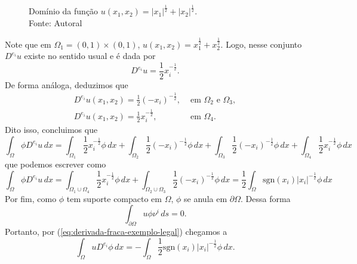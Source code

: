 \documentclass[a4paper, 11pt]{book}
\theoremstyle{definition}
\newcommand{\sgn}{\mathrm{sgn}}
\begin{document}
\begin{ex}
\begin{figure}[H]
        \caption{Domínio da função $u(x_1,x_2) = |x_1|^{\frac{1}{2}} + |x_2|^{\frac{1}{2}}$.\\
        Fonte: Autoral}
        \label{fig:dominio}
    \end{figure}
    Note que em $\Omega_1 = (0,1) \times (0,1)$, $u(x_1,x_2) = x_1^{\frac{1}{2}} + x_2^{\frac{1}{2}}$. Logo, nesse conjunto $D^{e_i} u$ existe no sentido usual e é dada por
    \[
        D^{e_i} u = \frac{1}{2} x_i^{-\frac{1}{2}}.
    \]
    De forma análoga, deduzimos que
    \[
        \begin{array}{ll}
            D^{e_i} u(x_1,x_2) = \frac{1}{2} (-x_i)^{-\frac{1}{2}}, &\text{ em } \Omega_2 \text{ e } \Omega_3, \\
            D^{e_i} u(x_1,x_2) = \frac{1}{2} x_i^{-\frac{1}{2}}, &\text{ em } \Omega_4.
        \end{array}
    \]
    Dito isso, concluimos que
    \[
        \int_\Omega \phi D^{e_i}u \,dx = \int_{\Omega_1}  \frac{1}{2} x_i^{-\frac{1}{2}}\phi \,dx + \int_{\Omega_2} \frac{1}{2} (-x_i)^{-\frac{1}{2}} \phi \,dx + \int_{\Omega_3} \frac{1}{2} (-x_i)^{-\frac{1}{2}} \phi \,dx + \int_{\Omega_4} \frac{1}{2} x_i^{-\frac{1}{2}} \phi \,dx
    \]
    que podemos escrever como
    \[
        \int_\Omega \phi D^{e_i} u \,dx = \int_{\Omega_1 \cup \Omega_4}  \frac{1}{2} x_i^{-\frac{1}{2}}\phi \,dx + \int_{\Omega_2 \cup \Omega_3} \frac{1}{2} (-x_i)^{-\frac{1}{2}} \phi \,dx = \frac{1}{2}\int_\Omega \sgn(x_i) |x_i|^{-\frac{1}{2}} \phi \,dx
    \]
    Por fim, como $\phi$ tem suporte compacto em $\Omega$, $\phi$ se anula em $\partial\Omega$.
    Dessa forma
    \[
        \int_{\partial\Omega} u \phi \nu^i \,ds = 0.
    \]
    Portanto, por (\ref{eq:derivada-fraca-exemplo-legal}) chegamos a
    \[
        \int_\Omega  u D^{e_i} \phi \,dx = - \int_\Omega \frac{1}{2}\sgn(x_i) |x_i|^{-\frac{1}{2}} \phi \,dx.
\]
\end{ex}
\end{document}
